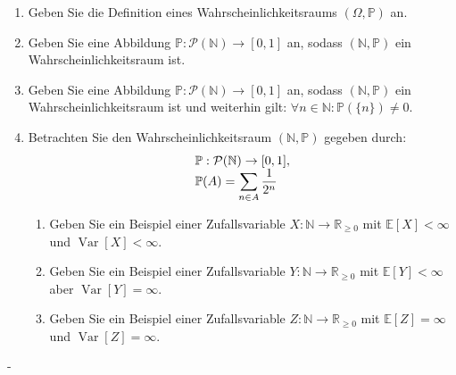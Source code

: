 \documentclass{article}
\begin{document}
\begin{problem}
\begin{enumerate}
\item {
Geben Sie die Definition eines Wahrscheinlichkeitsraums $(\Omega, \mathbb{P})$ an.
}
\item {
Geben Sie eine Abbildung $\mathbb{P}: \mathcal{P}(\mathbb{N}) \to [0, 1]$ an, sodass $(\mathbb{N}, \mathbb{P})$ ein Wahrscheinlichkeitsraum ist.
}
\item {
Geben Sie eine Abbildung $\mathbb{P}: \mathcal{P}(\mathbb{N}) \to [0, 1]$ an, sodass $(\mathbb{N}, \mathbb{P})$ ein Wahrscheinlichkeitsraum ist und weiterhin gilt: $\forall n \in \mathbb{N}: \mathbb{P}(\{n\}) \neq 0$.
}
\item {
Betrachten Sie den Wahrscheinlichkeitsraum $(\mathbb{N}, \mathbb{P})$ gegeben durch:
\[
\begin{array}{>{\displaystyle}l}
\mathbb{P}: \mathcal{P}(\mathbb{N}) \to [0, 1], \\
\mathbb{P}(A) = \sum_{n \in A} \frac{1}{2^n} \\
\end{array}
\]
\begin{enumerate}
\item {
Geben Sie ein Beispiel einer Zufallsvariable $X: \mathbb{N} \to \mathbb{R}_{\geq 0}$ mit $\mathbb{E}[X] < \infty$ und $\operatorname{Var}[X] < \infty$.
}
\item {
Geben Sie ein Beispiel einer Zufallsvariable $Y: \mathbb{N} \to \mathbb{R}_{\geq 0}$ mit $\mathbb{E}[Y] < \infty$ aber $\operatorname{Var}[Y] = \infty$.
}
\item {
Geben Sie ein Beispiel einer Zufallsvariable $Z: \mathbb{N} \to \mathbb{R}_{\geq 0}$ mit $\mathbb{E}[Z] = \infty$ und $\operatorname{Var}[Z] = \infty$.
}
\end{enumerate}
}
\end{enumerate}
\end{problem}

\begin{solution}
-
\end{solution}

\newpage
\end{document}

